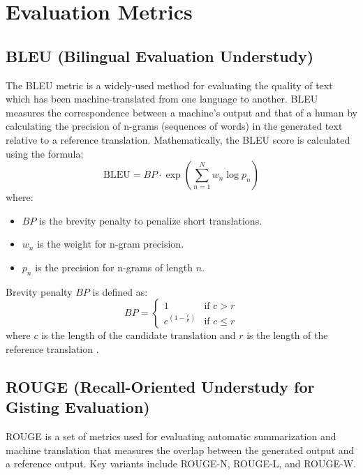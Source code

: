 \section{Evaluation Metrics}
\subsection{BLEU (Bilingual Evaluation Understudy)}

The BLEU metric is a widely-used method for evaluating the quality of text which has been machine-translated from one language to another. BLEU measures the correspondence between a machine's output and that of a human by calculating the precision of n-grams (sequences of words) in the generated text relative to a reference translation. Mathematically, the BLEU score is calculated using the formula:
\[
\text{BLEU} = BP \cdot \exp \left( \sum_{n=1}^{N} w_n \log p_n \right)
\]
where:
\begin{itemize}
    \item \( BP \) is the brevity penalty to penalize short translations.
    \item \( w_n \) is the weight for n-gram precision.
    \item \( p_n \) is the precision for n-grams of length \( n \).
\end{itemize}

Brevity penalty \( BP \) is defined as:
\[
BP = 
\begin{cases} 
1 & \text{if } c > r \\
e^{(1-\frac{r}{c})} & \text{if } c \leq r 
\end{cases}
\]
where \( c \) is the length of the candidate translation and \( r \) is the length of the reference translation \cite{Reiter2018A}.

\subsection{ROUGE (Recall-Oriented Understudy for Gisting Evaluation)}

ROUGE is a set of metrics used for evaluating automatic summarization and machine translation that measures the overlap between the generated output and a reference output. Key variants include ROUGE-N, ROUGE-L, and ROUGE-W.

